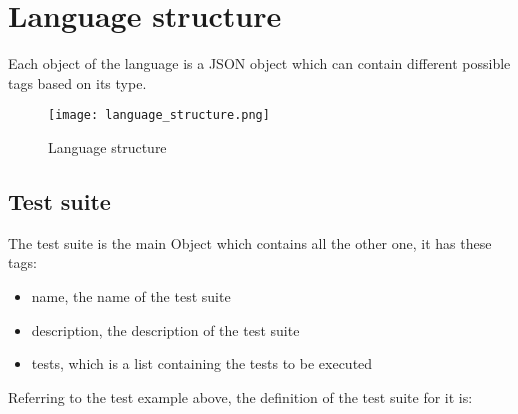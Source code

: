 

\section{Language structure}
Each object of the language is a JSON object which can contain different possible tags based on its type.
\begin{figure}
    \texttt{[image: language\_structure.png]}
    \caption{Language structure}
    \label{fig:language_structure}
\end{figure}


\subsection{Test suite}
The test suite is the main Object which contains all the other one, it has these tags:
\begin{itemize}
    \item name, the name of the test suite
    \item description, the description of the test suite
    \item tests, which is a list containing the tests to be executed
\end{itemize}
Referring to the test example above, the definition of the test suite for it is:

